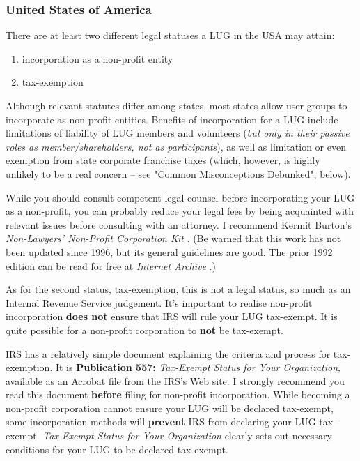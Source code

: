 \subsubsection{United States of America}

There are at least two different legal statuses a LUG in the USA may
attain:

\begin{enumerate}
\item incorporation as a non-profit entity
\item tax-exemption
\end{enumerate}


Although relevant statutes differ among states, most states
allow user groups to incorporate as non-profit entities. Benefits
of incorporation for a LUG include limitations of liability
of LUG members and volunteers ({\itshape but only in their passive roles
as member/shareholders, not as participants\/}), as well as 
limitation or even exemption from state corporate franchise taxes
(which, however, is highly unlikely to be a real concern -- see 
"Common Misconceptions Debunked", below).

While you should consult competent legal counsel before incorporating
your LUG as a non-profit, you can probably reduce your legal
fees by being acquainted with relevant issues before consulting
with an attorney. I recommend Kermit Burton's {\itshape 
\emph{Non-Lawyers' Non-Profit Corporation Kit} \texttt{\aelurl}
\/}.  (Be warned that this work has not been
updated since 1996, but its general guidelines are good.  The prior
1992 edition can be read for free at {\itshape 
\emph{Internet Archive} \texttt{\aemurl}
\/}.)

As for the second status, tax-exemption, this is not a legal status, so
much as an Internal Revenue Service judgement.  It's important to realise
non-profit incorporation {\bfseries does not} ensure that IRS will rule
your LUG tax-exempt.  It is quite possible for a non-profit corporation
to {\bfseries not} be tax-exempt.

IRS has a relatively simple document explaining the criteria
and process for tax-exemption. It is {\bfseries Publication 557:} {\itshape Tax-Exempt Status for Your Organization\/}, available as
an Acrobat file from the IRS's Web site. I strongly recommend
you read this document {\bfseries before} filing for non-profit incorporation.
While becoming a non-profit corporation cannot
ensure your LUG will be declared tax-exempt, some
incorporation methods will {\bfseries prevent} IRS from declaring your
LUG tax-exempt. {\itshape Tax-Exempt Status for Your Organization\/} clearly sets out necessary conditions for your LUG to be declared
tax-exempt.

